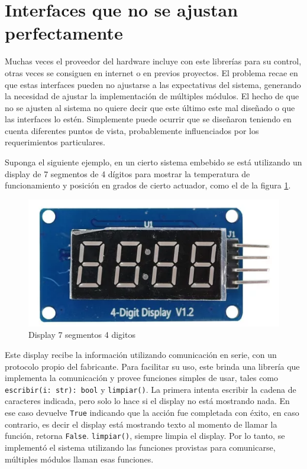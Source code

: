 \section{Interfaces que no se ajustan perfectamente}
Muchas veces el proveedor del hardware incluye con este librerías para su control, otras veces se consiguen en internet o en previos proyectos. El problema recae en que estas interfaces pueden no ajustarse a las expectativas del sistema, generando la necesidad de ajustar la implementación de múltiples módulos. El hecho de que no se ajusten al sistema no quiere decir que este último este mal diseñado o que las interfaces lo estén. Simplemente puede ocurrir que se diseñaron teniendo en cuenta diferentes puntos de vista, probablemente influenciados por los requerimientos particulares.

Suponga el siguiente ejemplo, en un cierto sistema embebido se está utilizando un display de 7 segmentos de 4 dígitos para mostrar la temperatura de funcionamiento y posición en grados de cierto actuador, como el de la figura \ref{fig:enter-label}.

\begin{figure}[h]
    \centering
    \includegraphics[width=0.5\linewidth]{display.png}
    \caption{Display 7 segmentos 4 digitos}
    \label{fig:enter-label}
\end{figure}

Este display recibe la información utilizando comunicación en serie, con un protocolo propio del fabricante. Para facilitar su uso, este brinda una librería que implementa la comunicación y provee funciones simples de usar, tales como \verb|escribir(i: str): bool| y \verb|limpiar()|. La primera intenta escribir la cadena de caracteres indicada, pero solo lo hace si el display no está mostrando nada. En ese caso devuelve \verb|True| indicando que la acción fue completada con éxito, en caso contrario, es decir el display está mostrando texto al momento de llamar la función, retorna \verb|False|. \verb|limpiar()|, siempre limpia el display. Por lo tanto, se implementó el sistema utilizando las funciones provistas para comunicarse, múltiples módulos llaman esas funciones.

